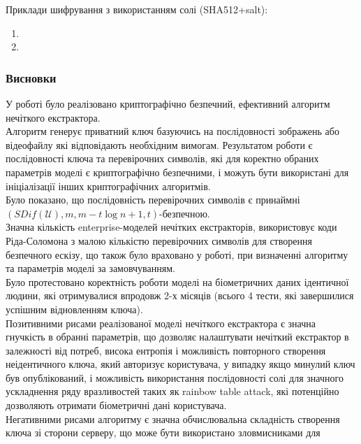 \documentclass[11pt]{article}
\begin{document}
    Приклади шифрування з використанням солі (SHA512+salt):

\begin{enumerate}
\def\labelenumi{\arabic{enumi}.}
\item
\item
\end{enumerate}

    \hypertarget{ux432ux438ux441ux43dux43eux432ux43aux438}{%
\subsubsection{Висновки}\label{ux432ux438ux441ux43dux43eux432ux43aux438}}

У роботі було реалізовано криптографічно безпечний, ефективний алгоритм
нечіткого екстрактора.\\
Алгоритм генерує приватний ключ базуючись на послідовності зображень або
відеофайлу які відповідають необхідним вимогам. Результатом роботи є
послідовності ключа та перевірочних символів, які для коректно обраних
параметрів моделі є криптографічно безпечними, і можуть бути використані
для ініціалізації інших криптографічних алгоритмів.\\
Було показано, що послідовність перевірочних символів є принаймні
\((SDif(\mathscr{U}),m,m-t\log{n+1},t)\)-безпечною.\\
Значна кількість enterprise-моделей нечітких екстракторів, використовує
коди Ріда-Соломона з малою кількістю перевірочних символів для створення
безпечного ескізу, що також було враховано у роботі, при визначенні
алгоритму та параметрів моделі за замовчуванням.\\
Було протестовано коректність роботи моделі на біометричних даних
ідентичної людини, які отримувалися впродовж 2-х місяців (всього 4
тести, які завершилися успішним відновленням ключа).\\
Позитивними рисами реалізованої моделі нечіткого екстрактора є значна
гнучкість в обранні параметрів, що дозволяє налаштувати нечіткий
екстрактор в залежності від потреб, висока ентропія і можливість
повторного створення неідентичного ключа, який авторизує користувача, у
випадку якщо минулий ключ був опублікований, і можливість використання
послідовності солі для значного ускладнення ряду вразливостей таких як
rainbow table attack, які потенційно дозволяють отримати біометричні
дані користувача.\\
Негативними рисами алгоритму є значна обчислювальна складність створення
ключа зі сторони серверу, що може бути використано зловмисниками для
\end{document}
